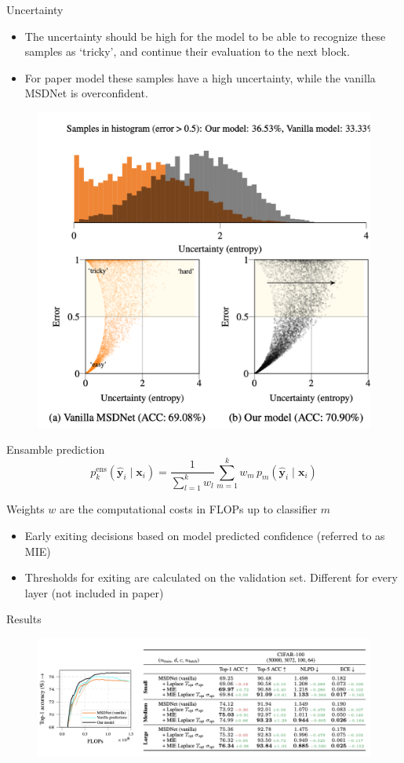 \documentclass[aspectratio=169,xcolor=dvipsnames]{beamer}
\begin{document}
\begin{frame}{Uncertainty}
    \begin{itemize}
        \item The uncertainty should be high for the model to be able to recognize these samples as ‘tricky’, and continue their evaluation to the next block.
        \item For paper model these samples have a high uncertainty, while the vanilla MSDNet is overconfident.
    \end{itemize}
    \begin{figure}
        \centering
        \includegraphics[width=0.35\linewidth]{figs/Screenshot 2025-04-08 at 15.25.23.png}
        \label{fig:enter-label}
    \end{figure}
\end{frame}

\begin{frame}{Ensamble prediction}
    \[
        p_k^{\text{ens}}(\hat{\mathbf{y}}_i \mid \mathbf{x}_i) =
        \frac{1}{\sum_{l=1}^{k} w_l} \sum_{m=1}^{k} w_m \, p_m(\hat{\mathbf{y}}_i \mid \mathbf{x}_i)
    \]

    \vspace{1mm}
    Weights \( w \) are the computational costs in FLOPs up to classifier \( m \)

    \vspace{3mm}
    \begin{itemize}
        \item Early exiting decisions based on model predicted confidence (referred to as MIE)
        \item Thresholds for exiting are calculated on the validation set. Different for every layer (not included in paper)
    \end{itemize}

\end{frame}

\begin{frame}{Results}

    \begin{figure}
        \centering
        \includegraphics[width=0.8\linewidth]{figs/Screenshot 2025-04-08 at 15.40.28.png}
        \label{fig:enter-label}
    \end{figure}

\end{frame}
\end{document}
